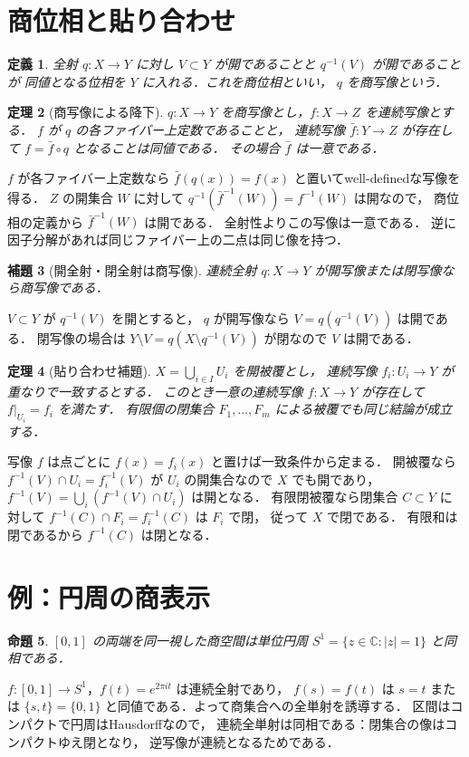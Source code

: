 \documentclass[a5paper,10pt,onecolumn]{jsarticle}
\makeatletter
\theoremstyle{mathnotetheorem}
\newtheorem{theorem}{定理}[section]
\newtheorem{definition}[theorem]{定義}
\newtheorem{lemma}[theorem]{補題}
\newtheorem{proposition}[theorem]{命題}
\renewcommand{\proofname}{証明}
\renewenvironment{proof}[1][\proofname]{%
  \par\pushQED{\qed}\normalfont\topsep4\p@\@plus2\p@\relax
  \trivlist\item[\hskip\labelsep\bfseries #1]\ignorespaces
}{\popQED\endtrivlist\@endpefalse}
\makeatother
\begin{document}
\section{商位相と貼り合わせ}
\begin{definition}
全射 $q:X\to Y$ に対し
$V\subset Y$ が開であることと $q^{-1}(V)$ が開であることが
同値となる位相を $Y$ に入れる．これを商位相といい，
$q$ を商写像という．
\end{definition}
\begin{theorem}[商写像による降下]\label{thm:quotient}
$q:X\to Y$ を商写像とし，$f:X\to Z$ を連続写像とする．
$f$ が $q$ の各ファイバー上定数であることと，
連続写像 $\bar f:Y\to Z$ が存在して
$f=\bar f\circ q$ となることは同値である．
その場合 $\bar f$ は一意である．
\end{theorem}
\begin{proof}
$f$ が各ファイバー上定数なら
$\bar f(q(x))=f(x)$ と置いてwell-definedな写像を得る．
$Z$ の開集合 $W$ に対して
$q^{-1}(\bar f^{-1}(W))=f^{-1}(W)$ は開なので，
商位相の定義から $\bar f^{-1}(W)$ は開である．
全射性よりこの写像は一意である．
逆に因子分解があれば同じファイバー上の二点は同じ像を持つ．
\end{proof}
\begin{lemma}[開全射・閉全射は商写像]
連続全射 $q:X\to Y$ が開写像または閉写像なら商写像である．
\end{lemma}
\begin{proof}
$V\subset Y$ が $q^{-1}(V)$ を開とすると，
$q$ が開写像なら $V=q(q^{-1}(V))$ は開である．
閉写像の場合は
$Y\setminus V=q(X\setminus q^{-1}(V))$ が閉なので $V$ は開である．
\end{proof}
\begin{theorem}[貼り合わせ補題]\label{thm:pasting}
$X=\bigcup_{i\in I}U_i$ を開被覆とし，
連続写像 $f_i:U_i\to Y$ が重なりで一致するとする．
このとき一意の連続写像 $f:X\to Y$ が存在して
$f|_{U_i}=f_i$ を満たす．
有限個の閉集合 $F_1,\dots,F_m$ による被覆でも同じ結論が成立する．
\end{theorem}
\begin{proof}
写像 $f$ は点ごとに $f(x)=f_i(x)$ と置けば一致条件から定まる．
開被覆なら $f^{-1}(V)\cap U_i=f_i^{-1}(V)$ が
$U_i$ の開集合なので $X$ でも開であり，
$f^{-1}(V)=\bigcup_i(f^{-1}(V)\cap U_i)$ は開となる．
有限閉被覆なら閉集合 $C\subset Y$ に対して
$f^{-1}(C)\cap F_i=f_i^{-1}(C)$ は $F_i$ で閉，
従って $X$ で閉である．
有限和は閉であるから $f^{-1}(C)$ は閉となる．
\end{proof}
\section{例：円周の商表示}
\begin{proposition}
$[0,1]$ の両端を同一視した商空間は単位円周
$S^1=\{z\in\mathbb C:|z|=1\}$ と同相である．
\end{proposition}
\begin{proof}
$f:[0,1]\to S^1$，$f(t)=e^{2\pi it}$ は連続全射であり，
$f(s)=f(t)$ は $s=t$ または $\{s,t\}=\{0,1\}$
と同値である．よって商集合への全単射を誘導する．
区間はコンパクトで円周はHausdorffなので，
連続全単射は同相である：閉集合の像はコンパクトゆえ閉となり，
逆写像が連続となるためである．
\end{proof}
\end{document}
